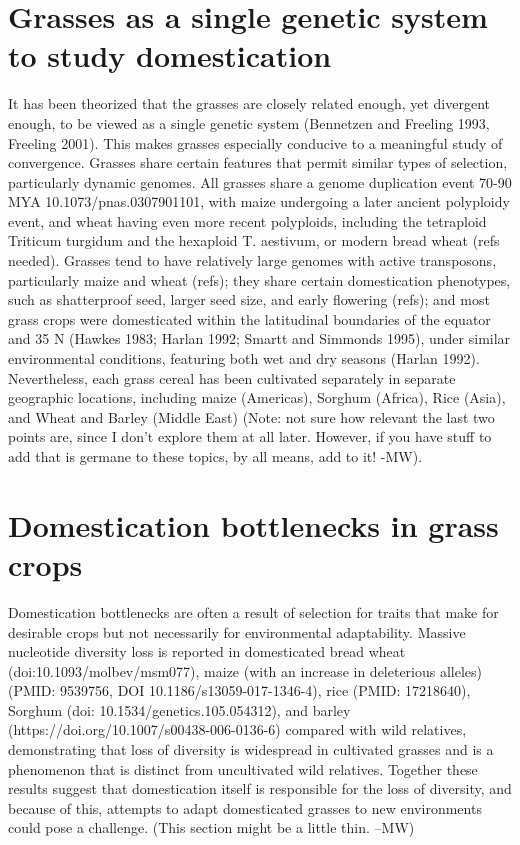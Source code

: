 \documentclass[12pt]{article}
\begin{document}
\section{Grasses as a single genetic system to study domestication}
It has been theorized that the grasses are closely related enough, yet divergent enough, to be viewed as a single genetic system (Bennetzen and Freeling 1993, Freeling 2001). This makes grasses especially conducive to a meaningful study of convergence. Grasses share certain features that permit similar types of selection, particularly dynamic genomes. All grasses share a genome duplication event 70-90 MYA 10.1073/pnas.0307901101, with maize undergoing a later ancient polyploidy event, and wheat having even more recent polyploids, including the tetraploid Triticum turgidum and the hexaploid T. aestivum, or modern bread wheat (refs needed). Grasses tend to  have relatively large genomes with active transposons, particularly maize and wheat (refs); they share certain domestication phenotypes, such as shatterproof seed, larger seed size, and early flowering (refs); and most grass crops were domesticated within the latitudinal boundaries of the equator and 35 N (Hawkes 1983; Harlan 1992; Smartt and Simmonds 1995), under similar environmental conditions, featuring both wet and dry seasons (Harlan 1992).  Nevertheless, each grass cereal has been cultivated separately in separate geographic locations, including maize (Americas), Sorghum (Africa), Rice (Asia), and Wheat and Barley (Middle East) (Note: not sure how relevant the last two points are, since I don't explore them at all later. However, if you have stuff to add that is germane to these topics, by all means, add to it! -MW). \paragraph{}

\section{Domestication bottlenecks in grass crops}
Domestication bottlenecks are often a result of selection for traits that make for desirable crops but not necessarily for environmental adaptability. Massive nucleotide diversity loss is reported in domesticated bread wheat (doi:10.1093/molbev/msm077), maize (with an increase in deleterious alleles) (PMID: 9539756, DOI 10.1186/s13059-017-1346-4), rice (PMID: 17218640), Sorghum (doi:  10.1534/genetics.105.054312), and barley (https://doi.org/10.1007/s00438-006-0136-6) compared with wild relatives, demonstrating that loss of diversity is widespread in cultivated grasses and is a phenomenon that is distinct from uncultivated wild relatives. Together these results suggest that domestication itself is responsible for the loss of diversity, and because of this, attempts to adapt domesticated grasses to new environments could pose a challenge. (This section might be a little thin. --MW)
\end{document}
